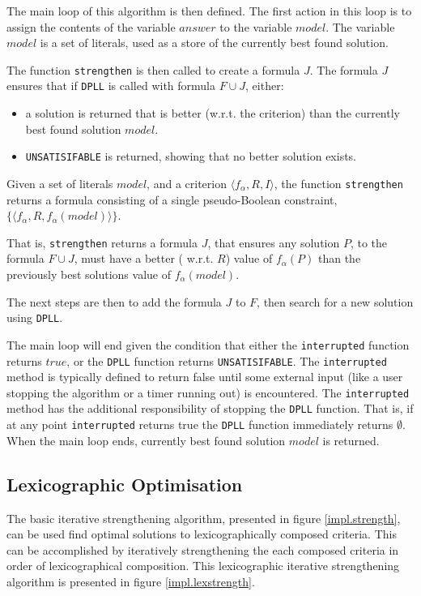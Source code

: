 The main loop of this algorithm is then defined.
The first action in this loop is to assign the contents of the variable $answer$ to the variable $model$.
The variable $model$ is a set of literals, used as a store of the currently best found solution.

The function \texttt{strengthen} is then called to create a formula $J$.
The formula $J$ ensures that if \texttt{DPLL} is called with formula $F \cup J$, either:
\begin{itemize}
  \item a solution is returned that is better (w.r.t. the criterion) than the currently best found solution $model$. 
  \item \texttt{UNSATISIFABLE} is returned, showing that no better solution exists.
\end{itemize}

\begin{defs}
Given a set of literals $model$, and a criterion $\langle f_{\alpha}, R, I \rangle$,
the function \texttt{strengthen} returns a formula consisting of a single pseudo-Boolean constraint, $\{ \langle f_{\alpha},R,f_{\alpha}(model) \rangle \}$.
\end{defs}
That is, \texttt{strengthen} returns a formula $J$,
that ensures any solution $P$, to the formula $F \cup J$, must have a better ( w.r.t. $R$) value of $f_{\alpha}(P)$ than the previously best solutions value of $f_{\alpha}(model)$.

The next steps are then to add the formula $J$ to $F$, then search for a new solution using \texttt{DPLL}.

The main loop will end given the condition that either the \texttt{interrupted} function returns $true$, or the \texttt{DPLL} function returns \texttt{UNSATISIFABLE}.
The \texttt{interrupted} method is typically defined to return false until some external input (like a user stopping the algorithm or a timer running out) is encountered.
The \texttt{interrupted} method has the additional responsibility of stopping the \texttt{DPLL} function.
That is, if at any point \texttt{interrupted} returns true the \texttt{DPLL} function immediately returns $\emptyset$.
When the main loop ends, currently best found solution $model$ is returned.

\subsection{Lexicographic Optimisation}
\label{impl.lexiterstre}
The basic iterative strengthening algorithm, presented in figure \ref{impl.strength}, can be used find optimal solutions to lexicographically composed criteria.
This can be accomplished by iteratively strengthening the each composed criteria in order of lexicographical composition.
This lexicographic iterative strengthening algorithm is presented in figure \ref{impl.lexstrength}.

